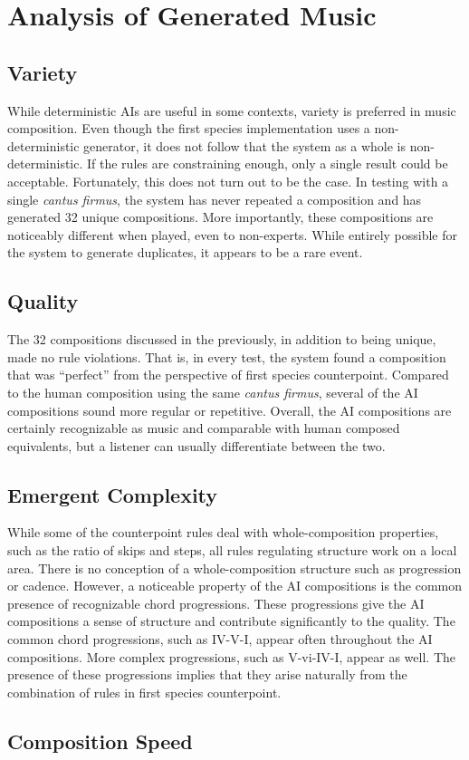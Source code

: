 \section{Analysis of Generated Music}

\subsection{Variety} 
While deterministic AIs are useful in some contexts, variety is preferred in music composition.
Even though the first species implementation uses a non-deterministic generator, it does not follow that the system as a whole is non-deterministic.
If the rules are constraining enough, only a single result could be acceptable.
Fortunately, this does not turn out to be the case.
In testing with a single \emph{cantus firmus}, the system has never repeated a composition and has generated 32 unique compositions.
More importantly, these compositions are noticeably different when played, even to non-experts.
While entirely possible for the system to generate duplicates, it appears to be a rare event.

\subsection{Quality} 
The 32 compositions discussed in the previously, in addition to being unique, made no rule violations.
That is, in every test, the system found a composition that was ``perfect'' from the perspective of first species counterpoint.
Compared to the human composition using the same \emph{cantus firmus}, several of the AI compositions sound more regular or repetitive.
Overall, the AI compositions are certainly recognizable as music and comparable with human composed equivalents, but a listener can usually differentiate between the two.

\subsection{Emergent Complexity} 
While some of the counterpoint rules deal with whole-composition properties, 
such as the ratio of skips and steps, all rules regulating structure work on a local area.
There is no conception of a whole-composition structure such as progression or cadence.
However, a noticeable property of the AI compositions is the common presence of recognizable chord progressions.
These progressions give the AI compositions a sense of structure and contribute significantly to the quality.
The common chord progressions, such as IV-V-I, appear often throughout the AI compositions.
More complex progressions, such as V-vi-IV-I, appear as well.
The presence of these progressions implies that they arise naturally from the combination of rules in first species counterpoint.

\subsection{Composition Speed} 
